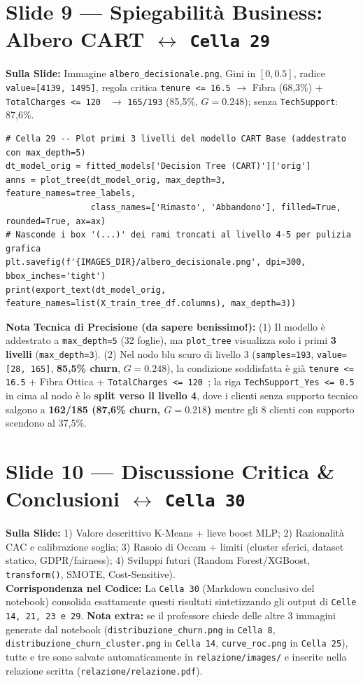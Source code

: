 \documentclass[10pt, a4paper]{article}
\begin{document}
\section*{Slide 9 --- Spiegabilità Business: Albero CART $\leftrightarrow$ \texttt{Cella 29}}
\noindent\textbf{Sulla Slide:} Immagine \texttt{albero\_decisionale.png}, Gini in $[0, 0.5]$, radice \texttt{value=[4139, 1495]}, regola critica \texttt{tenure <= 16.5} $\rightarrow$ Fibra (68,3\%) + \texttt{TotalCharges <= 120\,\texteuro} $\rightarrow$ \texttt{165/193} (85,5\%, $G=0.248$); senza \texttt{TechSupport}: 87,6\%.
\begin{lstlisting}
# Cella 29 -- Plot primi 3 livelli del modello CART Base (addestrato con max_depth=5)
dt_model_orig = fitted_models['Decision Tree (CART)']['orig']
anns = plot_tree(dt_model_orig, max_depth=3, feature_names=tree_labels,
                 class_names=['Rimasto', 'Abbandono'], filled=True, rounded=True, ax=ax)
# Nasconde i box '(...)' dei rami troncati al livello 4-5 per pulizia grafica
plt.savefig(f'{IMAGES_DIR}/albero_decisionale.png', dpi=300, bbox_inches='tight')
print(export_text(dt_model_orig, feature_names=list(X_train_tree_df.columns), max_depth=3))
\end{lstlisting}
\noindent\colorbox{WarnBg}{\parbox{\dimexpr\linewidth-2\fboxsep}{
\footnotesize\textbf{\color{PrimaryNavy}Nota Tecnica di Precisione (da sapere benissimo!):}
(1) Il modello è addestrato a \texttt{max\_depth=5} (32 foglie), ma \texttt{plot\_tree} visualizza solo i primi \textbf{3 livelli} (\texttt{max\_depth=3}).
(2) Nel nodo blu scuro di livello 3 (\texttt{samples=193}, \texttt{value=[28, 165]}, \textbf{85,5\% churn}, $G=0.248$), la condizione soddisfatta è già \texttt{tenure <= 16.5} + Fibra Ottica + \texttt{TotalCharges <= 120\,\texteuro}; la riga \texttt{TechSupport\_Yes <= 0.5} in cima al nodo è lo \textbf{split verso il livello 4}, dove i clienti senza supporto tecnico salgono a \textbf{162/185 (87,6\% churn, $G=0.218$)} mentre gli 8 clienti con supporto scendono al 37,5\%.
}}

\section*{Slide 10 --- Discussione Critica \& Conclusioni $\leftrightarrow$ \texttt{Cella 30}}
\noindent\textbf{Sulla Slide:} 1) Valore descrittivo K-Means + lieve boost MLP; 2) Razionalità CAC e calibrazione soglia; 3) Rasoio di Occam + limiti (cluster sferici, dataset statico, GDPR/fairness); 4) Sviluppi futuri (Random Forest/XGBoost, \texttt{transform()}, SMOTE, Cost-Sensitive).\\
\textbf{Corrispondenza nel Codice:} La \texttt{Cella 30} (Markdown conclusivo del notebook) consolida esattamente questi risultati sintetizzando gli output di \texttt{Celle 14, 21, 23 e 29}. \textbf{Nota extra:} se il professore chiede delle altre 3 immagini generate dal notebook (\texttt{distribuzione\_churn.png} in \texttt{Cella 8}, \texttt{distribuzione\_churn\_cluster.png} in \texttt{Cella 14}, \texttt{curve\_roc.png} in \texttt{Cella 25}), tutte e tre sono salvate automaticamente in \texttt{relazione/images/} e inserite nella relazione scritta (\texttt{relazione/relazione.pdf}).
\end{document}
